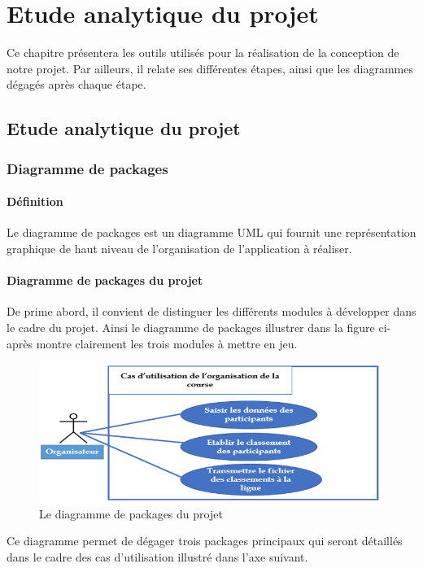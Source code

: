 \documentclass[12pt,a4paper]{report}
\begin{document}
	\chapter{Etude analytique du projet}

Ce chapitre présentera les outils utilisés pour la réalisation de la conception de notre projet. Par ailleurs, il relate ses différentes étapes, ainsi que les diagrammes dégagés après chaque étape.
\newpage
\section {Etude analytique du projet}


\subsection {Diagramme de packages }
\subsubsection{Définition}
Le diagramme de packages est un diagramme UML qui fournit une représentation graphique de haut niveau de l'organisation de l’application à réaliser.
\subsubsection{Diagramme de packages du projet}
De prime abord, il convient de distinguer les différents modules à développer dans le cadre du projet. Ainsi le diagramme de packages illustrer dans la figure ci-après montre clairement les trois modules à mettre en jeu.
\begin{figure}
	   \center
	   \includegraphics[scale=0.5]{Diagramme_de_packages.png}
	   \caption {Le diagramme de packages du projet}
\end{figure}

Ce diagramme permet de dégager trois packages principaux qui seront détaillés dans le cadre des cas d’utilisation illustré dans l’axe suivant.
\end{document}
